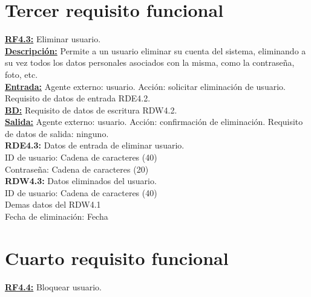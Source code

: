 \section{Tercer requisito funcional}
\textbf{\textcolor{rojo}{\underline{RF4.3:}}} Eliminar usuario. \\[6pt]

\textbf{\textcolor{rojo}{\underline{Descripción:}}} Permite a un usuario eliminar su cuenta del sistema, eliminando a su vez todos los datos personales asociados con la misma, como la contraseña, foto, etc. \\[6pt]

\textbf{\textcolor{rojo}{\underline{Entrada:}}} Agente externo: usuario. Acción: solicitar eliminación  de usuario. 
Requisito de datos de entrada \textcolor{azul}{RDE4.2}. \\[6pt]

\textbf{\textcolor{rojo}{\underline{BD:}}} Requisito de datos de escritura \textcolor{azul}{RDW4.2}. \\[6pt]

\textbf{\textcolor{rojo}{\underline{Salida:}}} Agente externo: usuario. Acción: confirmación de eliminación. 
Requisito de datos de salida: ninguno. \\[12pt]


\textcolor{azul}{\textbf{RDE4.3:}} Datos de entrada de eliminar usuario. \\[4pt]
\hspace*{1cm} ID de usuario: Cadena de caracteres (40)\\
\hspace*{1cm} Contraseña: Cadena de caracteres (20)\\[8pt]

\textcolor{azul}{\textbf{RDW4.3:}} Datos eliminados del usuario. \\[4pt]
\hspace*{1cm} ID de usuario: Cadena de caracteres (40)\\
\hspace*{1cm} Demas datos del RDW4.1\\
\hspace*{1cm} Fecha de eliminación: Fecha \\

\newpage

\section{Cuarto requisito funcional}
\textbf{\textcolor{rojo}{\underline{RF4.4:}}} Bloquear usuario. \\[6pt]

